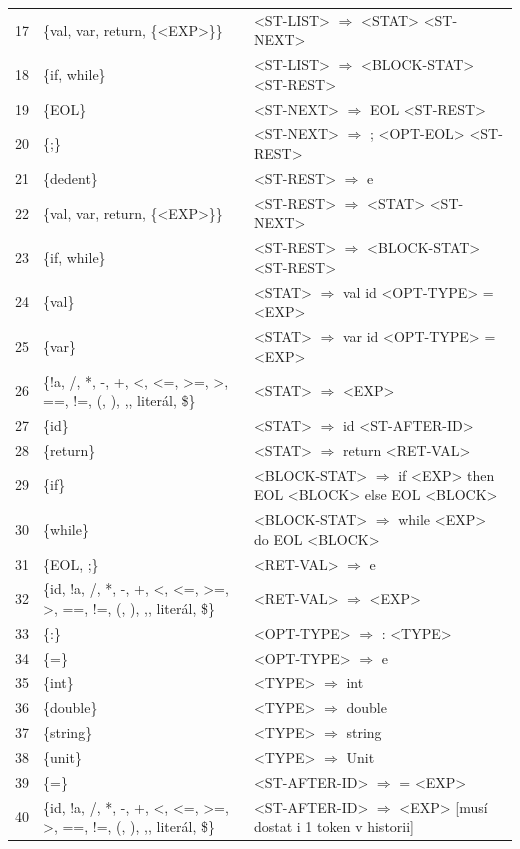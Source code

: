 \documentclass[12pt, a4paper]{article}
\begin{document}
{\begin{longtable}{|r|>{\raggedright\arraybackslash}p{}|>{\raggedright\arraybackslash}p{}|}
    17 & \{val, var, return, \{<EXP>\}\} & <ST-LIST> $\Rightarrow$ <STAT> <ST-NEXT> \\
    18 & \{if, while\} & <ST-LIST> $\Rightarrow$ <BLOCK-STAT> <ST-REST> \\
    19 & \{EOL\} & <ST-NEXT> $\Rightarrow$ EOL <ST-REST> \\
    20 & \{;\} & <ST-NEXT> $\Rightarrow$ ; <OPT-EOL> <ST-REST> \\
    21 & \{dedent\} & <ST-REST> $\Rightarrow$ e \\
    22 & \{val, var, return, \{<EXP>\}\} & <ST-REST> $\Rightarrow$ <STAT> <ST-NEXT> \\
    23 & \{if, while\} & <ST-REST> $\Rightarrow$ <BLOCK-STAT> <ST-REST> \\
    24 & \{val\} & <STAT> $\Rightarrow$ val id <OPT-TYPE> = <EXP> \\
    25 & \{var\} & <STAT> $\Rightarrow$ var id <OPT-TYPE> = <EXP> \\
    26 & \{!a, /, *, -, +, <, <=, >=, >, ==, !=, (, ), ,, literál, \$\} & <STAT> $\Rightarrow$ <EXP> \\
    27 & \{id\} & <STAT> $\Rightarrow$ id <ST-AFTER-ID> \\
    28 & \{return\} & <STAT> $\Rightarrow$ return <RET-VAL> \\
    29 & \{if\} & <BLOCK-STAT> $\Rightarrow$ if <EXP> then EOL <BLOCK> else EOL <BLOCK> \\
    30 & \{while\} & <BLOCK-STAT> $\Rightarrow$ while <EXP> do EOL <BLOCK> \\
    31 & \{EOL, ;\} & <RET-VAL> $\Rightarrow$ e \\
    32 & \{id, !a, /, *, -, +, <, <=, >=, >, ==, !=, (, ), ,, literál, \$\} & <RET-VAL> $\Rightarrow$ <EXP> \\
    33 & \{:\} & <OPT-TYPE> $\Rightarrow$ : <TYPE> \\
    34 & \{=\} & <OPT-TYPE> $\Rightarrow$ e \\
    35 & \{int\} & <TYPE> $\Rightarrow$ int \\
    36 & \{double\} & <TYPE> $\Rightarrow$ double \\
    37 & \{string\} & <TYPE> $\Rightarrow$ string \\
    38 & \{unit\} & <TYPE> $\Rightarrow$ Unit \\
    39 & \{=\} & <ST-AFTER-ID> $\Rightarrow$ = <EXP> \\
    40 & \{id, !a, /, *, -, +, <, <=, >=, >, ==, !=, (, ), ,, literál, \$\} & <ST-AFTER-ID> $\Rightarrow$ <EXP> [musí dostat i 1 token v historii] \\
\end{longtable}
}
\end{document}
